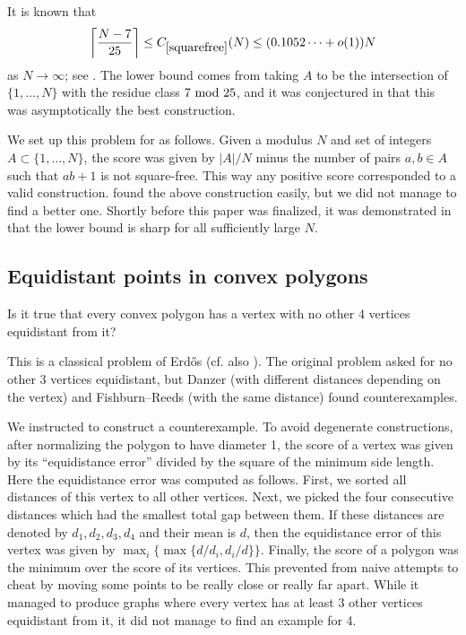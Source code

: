 It is known that
$$ \bigg\lceil \frac{N-7}{25} \bigg\rceil \leq C_{\ref{squarefree}}(N) \leq (0.1052 \dots +o(1)) N$$
as $N \to \infty$; see \cite[Problem 848]{erdosproblems}.  The lower bound comes from taking $A$ to be the intersection of $\{1,\dots,N\}$ with the residue class $7 \hbox{ mod } 25$, and it was conjectured in \cite{erdos1992} that this was asymptotically the best construction. 

We set up this problem for \AlphaEvolve as follows. Given a modulus $N$ and set of integers  $A\subset \{1,\dots,N\}$, the score was given by $|A|/N$ minus the number of pairs $a,b\in A$ such that $ab+1$ is not square-free. This way any positive score corresponded to a valid construction.  \AlphaEvolve found the above construction easily, but we did not manage to find a better one.  Shortly before this paper was finalized, it was demonstrated in \cite{sawhney} that the lower bound is sharp for all sufficiently large $N$.

\subsection{Equidistant points in convex polygons}

\renewcommand{\problemURL}{https://google-deepmind.github.io/alphaevolve_repository_of_problems/problems/53.html}

\begin{problem}
    Is it true that every convex polygon has a vertex with no other 4
vertices equidistant from it?
\end{problem}
This is a classical problem of Erd\H{o}s
\cite{erdos1961unsolved, erdos1990favourite, erdos1992unsolved, erdos1995favourite, erdos1997favourite} (cf. also \cite[Problem 97]{erdosproblems}).  The original problem asked for no other 3
vertices equidistant, but Danzer (with different distances depending on the vertex) and
Fishburn--Reeds
\cite{fishburn1992unit} (with the same distance) found counterexamples.

We instructed \AlphaEvolve to construct a counterexample. To avoid degenerate constructions, after normalizing the polygon to have diameter 1, the score of a vertex was given by its ``equidistance error'' divided by the square of the minimum side length. Here the equidistance error was computed as follows. First, we sorted all distances of this vertex to all other vertices. Next, we picked the four consecutive distances which had the smallest total gap between them. If these distances are denoted by $d_1,d_2,d_3,d_4$ and their mean is $d$, then the equidistance error of this vertex was given by $\max_i\{\max\{d/d_i, d_i/d\}\}$. Finally, the score of a polygon was the minimum over the score of its vertices. This prevented \AlphaEvolve from naive attempts to cheat by moving some points to be really close or really far apart. While it managed to produce graphs where every vertex has at least 3 other vertices equidistant from it, it did not manage to find an example for 4.



